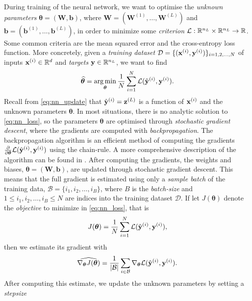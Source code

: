 \documentclass{statsmsc}
\begin{document}
{During training of the neural network, we want to optimise the \textit{unknown
parameters} $\bm{\theta}=(\mathbf{W}, \mathbf{b})$, where
$\mathbf{W}=\left(\boldsymbol{W}^{(1)},\dots,\boldsymbol{W}^{(L)}\right)$ and
$\mathbf{b}=\left(\boldsymbol{b}^{(1)},\dots,\boldsymbol{b}^{(L)}\right)$, in
order to minimize some \textit{criterion} $\mathcal{L}: \mathbb{R}^{n_L} \times \mathbb{R}^{n_L}
\rightarrow {\mathbb{R}}$. Some common criteria are the mean squared error and the
cross-entropy loss function.
More concretely, given a \textit{training dataset }
$\mathcal{D}=\{(\mathbf{x}^{(i)}, \mathbf{y}^{(i)})\}_{i=1,2,\dots,N}$ of inputs
$\mathbf{x}^{(i)} \in \mathbb{R}^d$ and \textit{targets} $\mathbf{y} \in \mathbb{R}^{n_L}$, we want to find
\begin{equation}\label{eq:nn_loss}
    \widehat{\bm\theta}= \operatorname*{arg\,min}_{\bm\theta}
    \frac{1}{N}  \sum^{N}_{i=1} \mathcal{L}(\hat{\mathbf{y}}^{(i)}, \mathbf{y}^{(i)}).
\end{equation}
Recall from \cref{eq:nn_update} that $\hat{\mathbf{y}}^{(i)}=\mathbf{z}^{(L)}$ is a function of
$\mathbf{x}^{(i)}$ and the unknown parameters $\bm\theta$.
In most situations, there is no analytic solution to \cref{eq:nn_loss}, so
the parameters $\bm\theta$ are optimised through \textit{stochastic gradient descent},
where the gradients are computed with \textit{backpropagation}.
The backpropagation algorithm is an efficient method of computing the gradients
$\frac{\partial }{\partial \bm\theta} \mathcal{L}(\hat{\mathbf{y}}^{(i)}, \mathbf{y}^{(i)}) $
using the chain-rule. A more comprehensive description of the algorithm can be
found in \cite{backprop}.
After computing the gradients, the weights and biases, $\bm\theta=(\mathbf{W},\mathbf{b})$, are updated through
stochastic gradient descent. This means that
the full gradient is estimated using only a \textit{sample batch} of the training data,
$\mathcal{B}=\{i_1,i_2,\dots,i_B\}$, where $B$ is the \textit{batch-size} and
$1\leq i_1,i_2,\dots,i_B \leq N$ are indices into the training dataset $\mathcal{D}$.
If let $J(\bm\theta)$ denote the \textit{objective} to minimize in \cref{eq:nn_loss}, that is
\begin{equation}
    J(\bm\theta)=\frac{1}{N} \sum^{N}_{i=1} \mathcal{L}(\hat{\mathbf{y}}^{(i)}, {\mathbf{y}}^{(i)}),
\end{equation}
then we estimate its gradient with
\begin{equation}
    \widehat{\nabla_{\bm\theta} J(\bm\theta)} = \frac{1}{|\mathcal{B}|} \sum_{i \in \mathcal{B}}
    \nabla_{\bm\theta} \mathcal{L}(\hat{\mathbf{y}}^{(i)}, {\mathbf{y}}^{(i)}).
\end{equation}
After computing this estimate, we update the unknown parameters by setting a \textit{stepsize}
}
\end{document}
